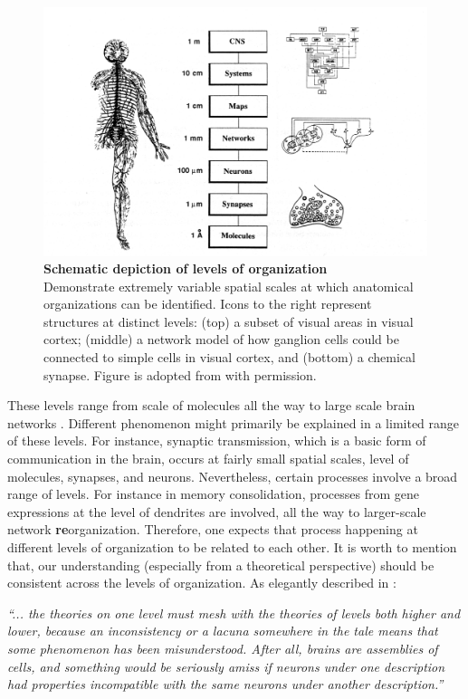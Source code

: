 \begin{figure}[h]
  \centering
  \includegraphics[width = \linewidth]{gfx/churchlan1988pcn_fig1.png}
  \caption{\textbf{Schematic depiction of levels of organization}\\
    Demonstrate extremely variable spatial scales at which anatomical organizations can be identified.
    Icons to the right represent structures at distinct levels:
    (top)
    a subset of visual areas in visual cortex;
    (middle)
    a network model of how ganglion cells could be connected to simple cells in visual cortex,
    and (bottom)
    a chemical synapse.
    Figure is adopted from \citet{churchlandPerspectivesCognitiveNeuroscience1988} with permission.}
  \label{fig:levelOfOrg}
\end{figure}
These levels range from scale of molecules all the way to large scale brain networks
\cite[Chapter 1]{churchlandComputationalBrain1992}.
Different phenomenon might primarily be explained in a limited range of these levels.
For instance, synaptic transmission, which is a basic form of communication in the brain, occurs at fairly small spatial scales, \ie level of molecules, synapses, and neurons.
Nevertheless, certain processes involve a broad range of levels. %
For instance in memory consolidation,
processes from gene expressions at the level of dendrites are involved,
all the way to larger-scale network \textbf{re}organization.
Therefore, one expects that process happening at different levels of organization to be related to each other.
It is worth to mention that, our understanding (especially from a theoretical perspective)
should be consistent across the levels of organization.
As elegantly described in \citet[Chapter 1]{churchlandComputationalBrain1992}:
% 
\begin{displayquote}\textsl{
    ``... the theories on one level must mesh with the theories of levels both
    higher and lower, because an inconsistency or a lacuna somewhere in the tale
    means that some phenomenon has been misunderstood.
    After all, brains are assemblies of cells, and something would be seriously amiss if neurons under
    one description had properties incompatible with the same neurons under
    another description.''
  }
\end{displayquote}


